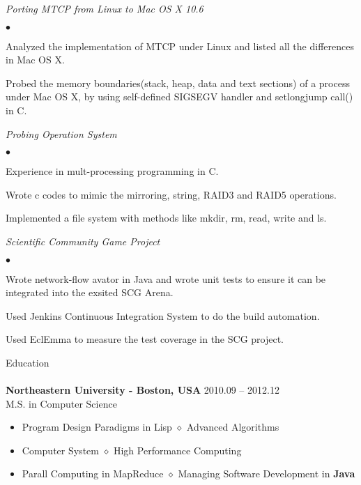 \documentclass[10pt]{article}
\newcommand{\lineunder}{\vspace*{-8pt}\\\hspace*{-18pt}\hrulefill\\}
\newcommand{\header}[1]{{\hspace*{-15pt}\vspace*{6pt}\LARGE{{#1}}}\vspace*{-6pt}\lineunder}
\newcommand{\project}[1]{\checkmark\normalsize{{\emph{#1}}}\\}
\newenvironment{achievements}
    {\begin{list}
        {$\bullet$}{\topsep 0pt \itemsep -1pt}} 
    {\end{list}}
\newcommand{\college}[5]{
    \textbf{#1 #2} \hfill #3 \\ #4 \\ #5
}
\begin{document}
  
  \project{Porting MTCP from Linux to Mac OS X 10.6}
  \begin{achievements}
\item Analyzed the implementation of MTCP under Linux and listed all the differences in Mac OS X.
\item Probed the memory boundaries(stack, heap, data and text sections) of a process under Mac OS X, by using self-defined SIGSEGV handler and setlongjump call() in C.
  \end{achievements}

\project{Probing Operation System}
  \begin{achievements}
\item Experience in mult-processing programming in C.
\item Wrote c codes to mimic the mirroring, string, RAID3 and RAID5 operations.
\item Implemented a file system with methods like mkdir, rm, read, write and ls.
  \end{achievements}

\project{Scientific Community Game Project}
  \begin{achievements}
\item Wrote network-flow avator in Java and wrote unit tests to ensure it can be integrated into the exsited SCG Arena.
\item Used Jenkins Continuous Integration System to do the build automation.
\item Used EclEmma to measure the test coverage in the SCG project.
  \end{achievements}


\vspace*{10pt}


\header{Education}

\college{Northeastern University}{- Boston, USA} {2010.09 -- 2012.12}
{M.S. in Computer Science}
{
\begin{itemize}
  \setlength{\itemsep}{0pt}
  \setlength{\parsep}{0pt}
  \setlength{\parskip}{0pt}
  \item {Program Design Paradigms in Lisp $\diamond$ Advanced Algorithms}
  \item {Computer System $\diamond$ High Performance Computing}
  \item {Parall Computing in MapReduce $\diamond$ Managing Software Development in \textbf{Java}}
\end{itemize}
}
\end{document}
